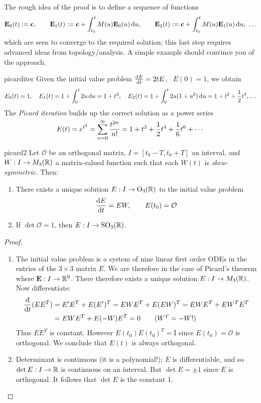 \goodbreak

The rough idea of the proof is to define a sequence of functions
\[
	\vE_0(t):=\vc,\qquad \vE_1(t):=\vc+\int_{t_0}^tM(u)\vE_0(u)\,\du,\qquad \vE_2(t):=\vc+\int_{t_0}^tM(u)\vE_1(u)\,\du,\ \ldots
\]
which are seen to converge to the required solution; this last step requires advanced ideas from topology/analysis. A simple example should convince you of the approach.

\begin{example}{}{picarditer}
	Given the initial value problem $\diff[E]{t}=2tE$, \ $E(0)=1$, we obtain
	\begin{gather*}
		E_0(t)=1,\quad E_1(t)=1+\int_0^t 2u\,\du=1+t^2,\quad
		E_2(t)=1+\int_0^t2u(1+u^2)\,\du =1+t^2+\frac 12t^4,\ldots
	\end{gather*}
	The \emph{Picard iteration} builds up the correct solution as a power series
	\[
		E(t)=e^{t^2}=\smash[t]{\sum\limits_{n=0}^\infty\frac{t^{2n}}{n!}}=1+t^2+\frac 12t^4+\frac 16t^6+\cdots
	\]
\end{example}



\begin{cor}{}{picard2}
	Let $\mathcal O$ be an orthogonal matrix, $I=[t_0-T,t_0+T]$ an interval, and $W:I\to M_3(\R)$ a matrix-valued function such that each $W(t)$ is \emph{skew-symmetric.}  Then:
	\begin{enumerate}\itemsep0pt
	  \item There exists a unique solution $E:I\to \rO_3(\R)$ to the initial value problem
	  \[
	  	\diff[E]{t}=E W,\qquad E(t_0)=\mathcal O
	  \]
	  \item If $\det\mathcal O=1$, then $E:I\to\rSO_3(\R)$.
	\end{enumerate}
\end{cor}

\begin{proof}
	\begin{enumerate}
	  \item The initial value problem is a system of nine linear first order ODEs in the entries of the $3\times 3$ matrix $E$. We are therefore in the case of Picard's theorem where $\vE:I\to\R^9$. There therefore exists a unique solution $E:I\to M_3(\R)$. Now differentiate:
	  \begin{align*}
	  	\diff t(EE^T)&=E'E^T+E(E')^T =EWE^T+E(EW)^T =EWE^T+EW^TE^T\\
	  	&=EWE^T+E(-W)E^T=0 \tag{$W^T=-W$!}
	  \end{align*}
	  Thus $EE^T$ is constant. However $E(t_0)E(t_0)^T=\mathrm I$ since $E(t_0)=\mathcal O$ is orthogonal. We conclude that $E(t)$ is always orthogonal.
	  \item Determinant is continuous (it is a polynomial!); $E$ is differentiable, and so $\det E:I\to\R$ is continuous on an interval. But $\det E=\pm 1$ since $E$ is orthogonal. It follows that $\det E$ is the constant 1.\qedhere
	\end{enumerate}
\end{proof}

